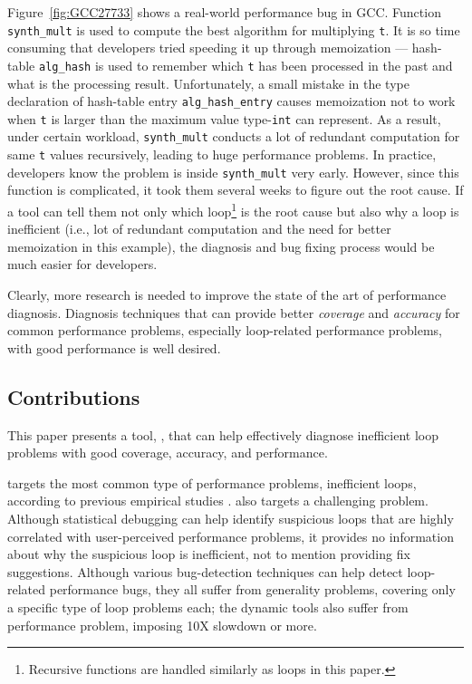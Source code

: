 Figure~\ref{fig:GCC27733} shows a real-world performance bug in GCC. 
Function \texttt{synth\_mult} is used to compute the best algorithm for 
multiplying \texttt{t}. It is so time consuming that developers tried 
speeding it up through memoization ---
hash-table
\texttt{alg\_hash} is used to remember which \texttt{t} has been processed
in the past and what is the processing result. 
Unfortunately, a small mistake in the type declaration of hash-table
entry \texttt{alg\_hash\_entry} causes memoization not to work when \texttt{t}
is larger than the maximum value type-\texttt{int} can represent.
As a result, under certain workload, \texttt{synth\_mult} conducts a lot of
redundant computation for same \texttt{t} values recursively, leading to
huge performance problems.  In practice, developers know the problem is inside
\texttt{synth\_mult} very early. However, since this function is 
complicated, it took them several weeks to figure out the root cause. 
If a tool can tell them not only which loop\footnote{Recursive functions are
handled similarly as loops in this paper.}
is the root cause but also why a loop is inefficient (i.e., lot of redundant
computation and the need for better memoization in this example), 
the diagnosis and bug fixing
process would be much easier for developers. 

Clearly, more research is needed to improve the state of the art of performance
diagnosis. Diagnosis techniques that can provide better
\textit{coverage} and \textit{accuracy} for common performance problems,
especially loop-related performance problems, with good
performance is well desired.


\subsection{Contributions}
This paper presents a tool, \Tool, that can help effectively diagnose
inefficient loop problems with good coverage, accuracy, and performance.

\Tool targets the most common type of performance problems, inefficient
loops, according to previous
empirical studies \cite{SongOOPSLA2014,PerfBug}.
\Tool also targets a challenging problem. Although
statistical debugging \cite{SongOOPSLA2014}
can help identify suspicious loops that are highly correlated with 
user-perceived performance problems,
it provides no information about why the suspicious loop is inefficient,
not to mention providing fix suggestions. Although various
bug-detection techniques \cite{Cachetor,Alabama,CARAMEL} can help detect
loop-related performance bugs, they all suffer from generality problems,
covering only a specific type of loop problems each; the dynamic
tools \cite{Cachetor,Alabama} also suffer from performance
problem, imposing 10X slowdown or more.

